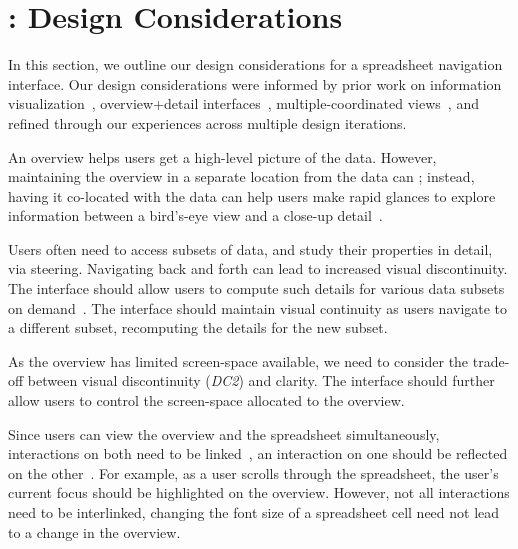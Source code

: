 

\section{\noah: Design Considerations}
\label{sec:design}
In this section,
we outline our design considerations
for a spreadsheet navigation interface.
Our design considerations were
informed by prior work on
information visualization~\cite{shneiderman2003eyes,brehmer2013multi}, 
overview+detail interfaces~\cite{cockburn2009review}, multiple-coordinated views~\cite{wang2000guidelines},
and refined through our experiences
across multiple design iterations.

An overview helps users get a high-level picture
of the data.
However, maintaining the overview in a separate
location from the data can ;
instead, having it co-located with the data
can help users make rapid glances to
explore information between a
bird's-eye view
and a close-up detail~\cite{grudin2001partitioning}.

Users often need to access subsets of data,
and study their properties in detail, \eg via steering.
Navigating back and forth 
can lead to increased visual discontinuity.
The interface should allow users to compute such details for
various data subsets on demand~\cite{shneiderman2003eyes}.
The interface should maintain visual continuity
as users navigate to a different subset,
recomputing the details for the new subset.

As the overview
has limited screen-space available,
we need to consider the trade-off between visual discontinuity (\emph{DC2}) and clarity.
The interface should further allow users to control the screen-space allocated
to the overview.


Since users can view the overview
and the spreadsheet simultaneously,
interactions on both need to be linked~\cite{roberts2007state},
\ie an interaction on one should be reflected on
the other~\cite{wang2000guidelines}.
For example, as a user scrolls through
the spreadsheet, the user's current focus
should be highlighted on the overview.
However, not all interactions need to be interlinked,
\eg changing the font size of a spreadsheet cell
need not lead to a change in the overview.




